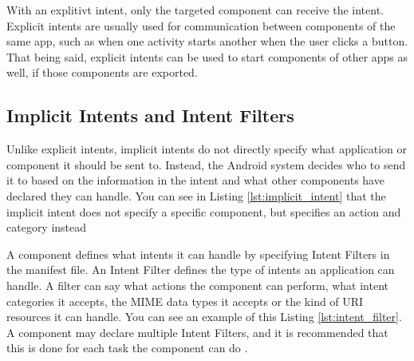     
    
    With an explitivt intent, only the targeted component can receive the intent. Explicit intents are usually used for communication between components of the same app, such as when one activity starts another when the user clicks a button. That being said, explicit intents can be used to start components of other apps as well, if those components are exported.
    
    \subsection{Implicit Intents and Intent Filters}
        \label{subsec:implicit_intents}
        
    Unlike explicit intents, implicit intents do not directly specify what application or component it should be sent to. Instead, the Android system decides who to send it to based on the information in the intent and what other components have declared they can handle. You can see in Listing \ref{lst:implicit_intent} that the implicit intent does not specify a specific component, but specifies an action and category instead
    
    A component defines what intents it can handle by specifying Intent Filters in the manifest file. An Intent Filter defines the type of intents an application can handle. A filter can say what actions the component can perform, what intent categories it accepts, the MIME data types it accepts or the kind of URI resources it can handle. You can see an example of this Listing \ref{lst:intent_filter}. A component may declare multiple Intent Filters, and it is recommended that this is done for each task the component can do \cite{intents_and_intent_filters}.
    
    
    
    
    
